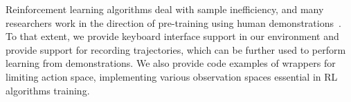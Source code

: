 \documentclass[sigconf]{aamas}
\begin{document}
Reinforcement learning algorithms deal with sample inefficiency, and many researchers work in the direction of pre-training using human demonstrations~\citep{de2019pre}. To that extent, we provide keyboard interface support in our environment and provide support for recording trajectories, which can be further used to perform learning from demonstrations. We also provide code examples of wrappers for limiting action space, implementing various observation spaces essential in RL algorithms training. 

\end{document}
